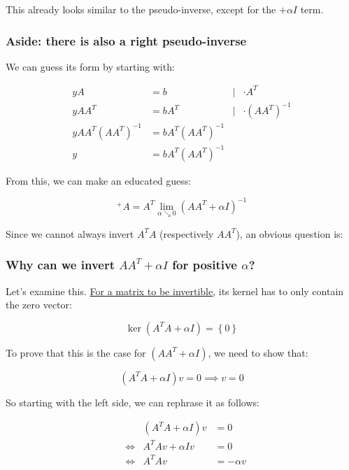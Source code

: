 \documentclass[]{scrartcl}
\begin{document}
This already looks similar to the pseudo-inverse, except for the
\(+\alpha I\) term.

\subsubsection{Aside: there is also a right
pseudo-inverse}\label{aside-there-is-also-a-right-pseudo-inverse}

We can guess its form by starting with:

\[
\begin{align*} yA&=b&|&\cdot A^{T}\\ yAA^{T}&=bA^{T}&|&\cdot \left( AA^{T}\right) ^{-1}\\ yAA^{T}\left( AA^{T}\right) ^{-1}&=bA^{T}\left( AA^{T}\right) ^{-1}\\ y&=bA^{T}\left( AA^{T}\right) ^{-1}\end{align*}
\]

From this, we can make an educated guess:

\[
^{+}A = A^{T}\lim _{\alpha \searrow 0}\left( AA^{T}+\alpha I\right) ^{-1}
\]

Since we cannot always invert \(A^TA\) (respectively \(AA^T\)), an
obvious question is:

\subsubsection{\texorpdfstring{Why can we invert \(AA^T+ \alpha I\) for
positive
\(\alpha\)?}{Why can we invert AA\^{}T+ \textbackslash{}alpha I for positive \textbackslash{}alpha?}}\label{why-can-we-invert-aat-alpha-i-for-positive-alpha}

Let's examine this.
\href{https://en.wikipedia.org/wiki/Invertible_matrix}{For a matrix to
be invertible}, its kernel has to only contain the zero vector:

\[\ker \left( A^{T}A+\alpha I\right) =\left\{ 0\right\}\]

To prove that this is the case for \(\left( AA^{T}+\alpha I\right)\), we
need to show that:

\[  \left( A^{T}A+\alpha I\right) v = 0 \implies v = 0\]

So starting with the left side, we can rephrase it as follows:

\[ \begin{align*} 
& & \left( A^{T}A+\alpha I\right) v&= 0\\ 
& \Leftrightarrow &A^{T}Av+\alpha Iv&= 0\\ 
& \Leftrightarrow &A^{T}Av &= -\alpha v
\end{align*} \]
\end{document}
